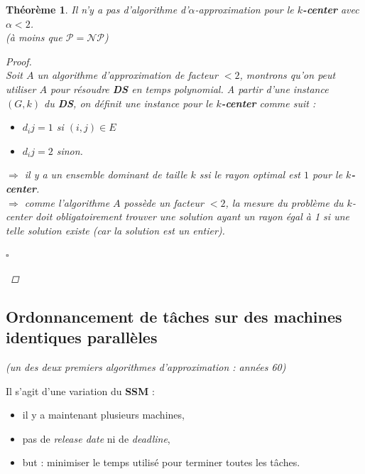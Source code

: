 \documentclass{article}
\newcommand{\titre}[1]{\textcolor{title}{#1}}
\newcommand{\cqfd}{\begin{flushright}$\square$\end{flushright}}
\newtheorem{thm}{Th\'eor\`eme}[section]
\newtheorem{proof}{Preuve}[section]
\begin{document}
\begin{sffamily}
\begin{thm}Il n'y a pas d'algorithme d'$\alpha$-approximation pour le \textbf{$k$-center} avec $\alpha <2$.\\ (à moins que $\mathcal{P} = 
\mathcal{NP}$)
\begin{proof}$ $\\
Soit $A$ un algorithme d'approximation de facteur $<2$, montrons qu'on peut utiliser $A$ pour résoudre \textbf{\titre{DS}} en temps 
polynomial. A partir d'une instance $(G,k)$ du \textbf{\titre{DS}}, on définit une instance pour le \textbf{$k$-center} comme suit :
\begin{itemize}
\item [$\bigstar$]$d_ij = 1$ si $(i,j) \in E$
\item [$\bigstar$]$d_ij = 2$ sinon.
\end{itemize}
$\Rightarrow$ il y a un ensemble dominant de taille $k$ ssi le rayon optimal est $1$ pour le \textbf{$k$-center}.\\
$\Rightarrow$ comme l'algorithme $A$ possède un facteur $< 2$, la mesure du problème du $k$-center doit obligatoirement trouver une 
solution ayant un rayon égal à 1 si une telle solution existe \textit{(car la solution est un entier)}.
\cqfd
\end{proof}
\end{thm}

\newpage

\subsection{Ordonnancement de tâches sur des machines identiques parallèles}

\begin{flushright}\textit{(un des deux premiers algorithmes d'approximation : années 60)}\end{flushright}

Il s'agit d'une variation du \textbf{\titre{SSM}} :
\begin{itemize}
\item il y a maintenant plusieurs machines,
\item pas de \textit{release date} ni de \textit{deadline},
\item but : minimiser le temps utilisé pour terminer toutes les tâches.
\end{itemize}


\end{sffamily}
\end{document}
